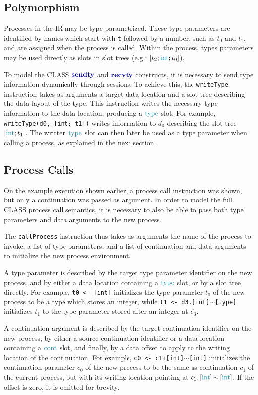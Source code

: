 \subsection{Polymorphism}

Processes in the \ac{IR} may be type parametrized. These type parameters are identified by names which start with \texttt{t} followed by a number, such as $t_0$ and $t_1$, and are assigned when the process is called. Within the process, types parameters may be used directly as slots in slot trees (e.g.: $\seqst{t_2; \ints; t_0}$).

To model the \ac{CLASS} $\sendtyp$ and $\recvtyp$ constructs, it is necessary to send type information dynamically through sessions. To achieve this, the \texttt{writeType} instruction takes as arguments a target data location and a slot tree describing the data layout of the type. This instruction writes the necessary type information to the data location, producing a $\types$ slot. For example, \texttt{writeType(d0, [int; t1])} writes information to $d_0$ describing the slot tree $\seqst{\ints; t_1}$. The written $\types$ slot can then later be used as a type parameter when calling a process, as explained in the next section.

\subsection{Process Calls}

On the example execution shown earlier, a process call instruction was shown, but only a continuation was passed as argument. In order to model the full \ac{CLASS} process call semantics, it is necessary to also be able to pass both type parameters and data arguments to the new process.

The \texttt{callProcess} instruction thus takes as arguments the name of the process to invoke, a list of type parameters, and a list of continuation and data arguments to initialize the new process environment.

A type parameter is described by the target type parameter identifier on the new process, and by either a data location containing a $\types$ slot, or by a slot tree directly. For example, \texttt{t0 <- [int]} initializes the type parameter $t_0$ of the new process to be a type which stores an integer, while \texttt{t1 <- d3.[int]$\mathtt{\sim}$[type]} initializes $t_1$ to the type parameter stored after an integer at $d_3$.

A continuation argument is described by the target continuation identifier on the new process, by either a source continuation identifier or a data location containing a $\conts$ slot, and finally, by a data offset to apply to the writing location of the continuation. For example, \texttt{c0 <- c1+[int]$\mathtt{\sim}$[int]} initializes the continuation parameter $c_0$ of the new process to be the same as continuation $c_1$ of the current process, but with its writing location pointing at $\datal{c_1}{\seqst{\ints}}{\seqst{\ints}}$. If the offset is zero, it is omitted for brevity.

